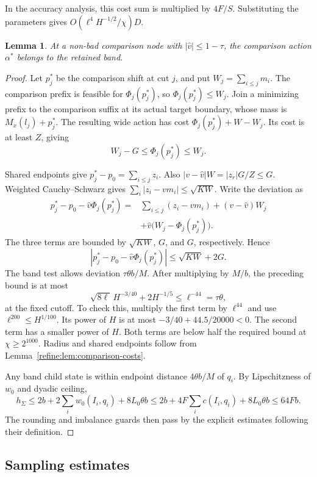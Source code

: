 \documentclass[11pt]{article}
\newtheorem{lemma}[theorem]{Lemma}
\theoremstyle{definition}
\newcommand{\1}{\mathbf 1}
\begin{document}
In the accuracy analysis, this cost sum is multiplied by $4F/S$.
Substituting the parameters gives $O(\ell^4H^{-1/2}/\chi)D$.

\begin{lemma}\label{refine:lem:coverage}
At a non-bad comparison node with $|\widehat v|\le1-\tau$, the comparison action $\alpha^*$ belongs to the retained band.
\end{lemma}
\begin{proof}
Let $p_j^*$ be the comparison shift at cut $j$, and put
$W_j=\sum_{i\le j}m_i$.
The comparison prefix is feasible for $\Phi_j(p_j^*)$, so
$\Phi_j(p_j^*)\le W_j$.
Join a minimizing prefix to the comparison suffix at its actual target
boundary, whose mass is $M_x(l_j)+p_j^*$.
The resulting wide action has cost $\Phi_j(p_j^*)+W-W_j$.
Its cost is at least $Z$, giving
\[
 W_j-G\le\Phi_j(p_j^*)\le W_j.
\]

Shared endpoints give $p_j^*-p_0=\sum_{i\le j}z_i$.
Also $|v-\widehat v|W=|z_r|G/Z\le G$.
Weighted Cauchy--Schwarz gives
$\sum_i|z_i-vm_i|\le\sqrt{KW}$.
Write the deviation as
\[
\begin{split}
 p_j^*-p_0-\widehat v\Phi_j(p_j^*)
 ={}&\sum_{i\le j}(z_i-vm_i)+(v-\widehat v)W_j\\
    &+\widehat v\bigl(W_j-\Phi_j(p_j^*)\bigr).
\end{split}
\]
The three terms are bounded by $\sqrt{KW}$, $G$, and $G$, respectively.
Hence
\[
 |p_j^*-p_0-\widehat v\Phi_j(p_j^*)|\le\sqrt{KW}+2G.
\]
The band test allows deviation $\tau\theta b/M$.
After multiplying by $M/b$, the preceding bound is at most
\[
 \sqrt{8\ell}\,H^{-3/40}+2H^{-1/5}\le\ell^{-44}=\tau\theta,
\]
at the fixed cutoff. To check this, multiply the first term by
$\ell^{44}$ and use $\ell^{200}\le H^{1/100}$.
Its power of $H$ is at most $-3/40+44.5/20000<0$.
The second term has a smaller power of $H$.
Both terms are below half the required bound at $\chi\ge2^{1000}$.
Radius and shared endpoints follow from
Lemma~\ref{refine:lem:comparison-costs}.

Any band child state is within endpoint distance $4\theta b/M$ of $q_i$. By Lipschitzness of $w_0$ and dyadic ceiling,
\[
 h_\Sigma\le2b+2\sum_i w_0(I_i,q_i)+8L_0\theta b
 \le2b+4F\sum_i c(I_i,q_i)+8L_0\theta b\le64Fb.
\]
The rounding and imbalance guards then pass by the explicit estimates following their definition.
\end{proof}

\subsection{Sampling estimates}\label{refine:sec:imports}
\end{document}
